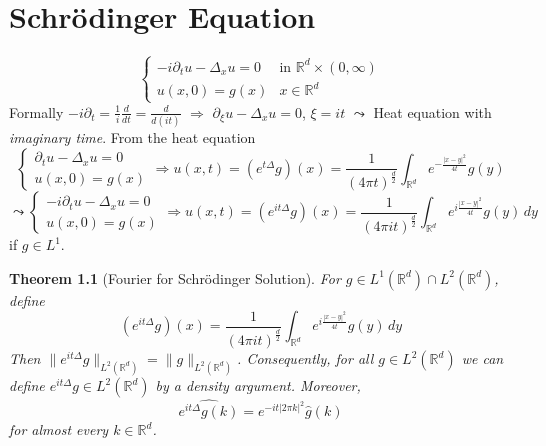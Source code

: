 \documentclass{report}
\theoremstyle{tommy}
\newtheorem{thm}[defn]{Theorem}
\begin{document}
  \chapter{Schrödinger Equation}
  \[\begin{cases}
    -i \partial_t u - \Delta_x u = 0 &\text{in } \mathbb{R}^d \times (0,\infty)\\
    u(x,0) = g(x) &x \in \mathbb{R}^d
  \end{cases}\]
  Formally 
  \(-i \partial_t = \frac{1}{i} \frac{d}{dt} = \frac{d}{d(it)}\) \(\Rightarrow\) \(\partial_\xi u - \Delta_x u = 0\), \(\xi = it\) \(\leadsto\) Heat equation with \emph{imaginary time}.
  From the heat equation 
  \[\begin{cases}
    \partial_t u - \Delta_x u = 0 \\ u(x,0) = g(x)
  \end{cases} \Rightarrow u(x,t) = (e^{t\Delta} g)(x) = \frac{1}{(4 \pi t)^{\frac{d}{2}}}\int_{\mathbb{R}^d} e^{-\frac{|x-y|^2}{4t}} g(y)\]
  \[\leadsto \begin{cases}
    - i \partial_t u - \Delta_x u = 0 \\ u(x,0) = g(x)
  \end{cases} \Rightarrow u(x,t) = (e^{it\Delta}g)(x) = \frac{1}{(4 \pi it)^{\frac{d}{2}}} \int_{\mathbb{R}^d} e^{i \frac{|x-y|^2}{4t}} g(y) \, dy\]
  if \(g \in L^1\).

  
  \begin{thm}[Fourier for Schrödinger Solution]\label{schroedinger-fourier}
    For \(g \in L^1(\mathbb{R}^d) \cap L^2(\mathbb{R}^d)\), define 
    \[(e^{it\Delta}g)(x) = \frac{1}{(4 \pi it)^{\frac{d}{2}}} \int_{\mathbb{R}^d} e^{i \frac{|x-y|^2}{4t}} g(y) \, dy\]
    Then \(\|e^{it\Delta}g\|_{L^2(\mathbb{R}^d)} = \|g\|_{L^2(\mathbb{R}^d)}\). Consequently, for all \(g \in L^2(\mathbb{R}^d)\) we can define \(e^{it \Delta} g \in L^2(\mathbb{R}^d)\) by a density argument. Moreover, 
    \[\widehat{e^{i t \Delta}g(k)} = e^{-it |2 \pi k|^2} \hat g(k)\]
    for almost every \(k \in \mathbb{R}^d\).
  \end{thm}
\end{document}
